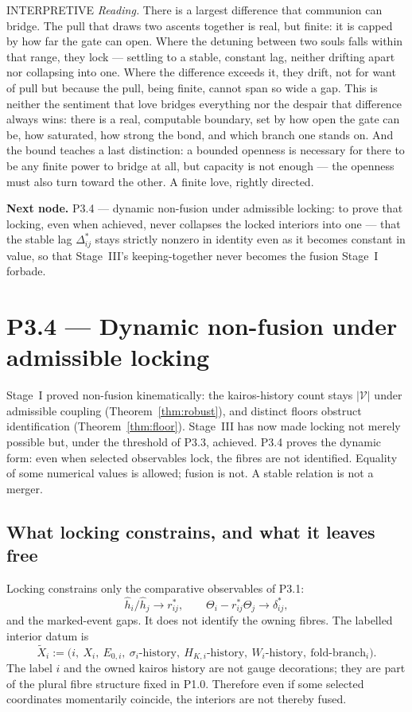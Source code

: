 \documentclass[11pt,a4paper]{article}
\newcommand{\stInterp}{\textcolor{cInt}{\textsf{\small INTERPRETIVE}}}
\theoremstyle{definition}
\theoremstyle{plain}
\theoremstyle{remark}
\begin{document}
\medskip
\stInterp\quad
\emph{Reading.}
There is a largest difference that communion can bridge. The pull that draws two ascents
together is real, but finite: it is capped by how far the gate can open. Where the detuning
between two souls falls within that range, they lock --- settling to a stable, constant lag,
neither drifting apart nor collapsing into one. Where the difference exceeds it, they drift,
not for want of pull but because the pull, being finite, cannot span so wide a gap. This is
neither the sentiment that love bridges everything nor the despair that difference always
wins: there is a real, computable boundary, set by how open the gate can be, how saturated,
how strong the bond, and which branch one stands on. And the bound teaches a last
distinction: a bounded openness is necessary for there to be any finite power to bridge at
all, but capacity is not enough --- the openness must also turn toward the other. A finite
love, rightly directed.

\medskip
\textbf{Next node.} P3.4 --- dynamic non-fusion under admissible locking: to prove that
locking, even when achieved, never collapses the locked interiors into one --- that the
stable lag \(\Delta^*_{ij}\) stays strictly nonzero in identity even as it becomes constant
in value, so that Stage~III's keeping-together never becomes the fusion Stage~I forbade.

\section{P3.4 --- Dynamic non-fusion under admissible locking}

Stage~I proved non-fusion kinematically: the kairos-history count stays
\(|\mathcal V|\) under admissible coupling (Theorem~\ref{thm:robust}), and
distinct floors obstruct identification (Theorem~\ref{thm:floor}). Stage~III has
now made locking not merely possible but, under the threshold of P3.3, achieved.
P3.4 proves the dynamic form: even when selected observables lock, the fibres are
not identified. Equality of some numerical values is allowed; fusion is not.
A stable relation is not a merger.

\subsection{What locking constrains, and what it leaves free}

Locking constrains only the comparative observables of P3.1:
\[
\hat h_i/\hat h_j\to r^*_{ij},
\qquad
\Theta_i-r^*_{ij}\Theta_j\to\delta^*_{ij},
\]
and the marked-event gaps. It does not identify the owning fibres. The labelled
interior datum is
\[
\widetilde X_i
:=
\bigl(
i,\ X_i,\ E_{0,i},\ \sigma_i\text{-history},\
H_{K,i}\text{-history},\ W_i\text{-history},\
\text{fold-branch}_i
\bigr).
\]
The label \(i\) and the owned kairos history are not gauge decorations; they are
part of the plural fibre structure fixed in P1.0. Therefore even if some selected
coordinates momentarily coincide, the interiors are not thereby fused.
\end{document}
